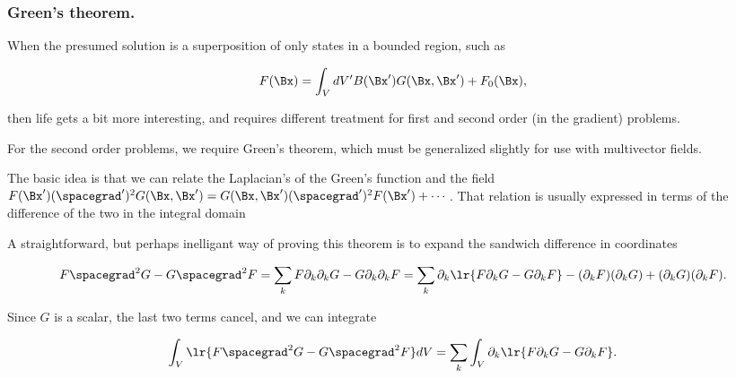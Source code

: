 \subsubsection{Green's theorem.}

When the presumed solution is a superposition of only states in a bounded region, such as

\begin{dmath}\label{eqn:greensFunctionHelmholtz:200}
F(\Bx) = \int_V dV' B(\Bx') G(\Bx, \Bx') + F_0(\Bx),
\end{dmath}

then life gets a bit more interesting, and requires different treatment for first and second order (in the gradient) problems.

For the second order problems, we require Green's theorem, which must be generalized slightly for use with multivector fields.

The basic idea is that we can relate the Laplacian's of the Green's function and the field
\( F(\Bx') (\spacegrad')^2 G(\Bx, \Bx') = G(\Bx, \Bx') (\spacegrad')^2 F(\Bx') + \cdots \).
That relation is usually expressed in terms of the difference of the two in the integral domain


A straightforward, but perhaps inelligant way of proving this theorem is to expand the sandwich difference in coordinates

\begin{dmath}\label{eqn:greensFunctionHelmholtz:260}
F \spacegrad^2 G - G \spacegrad^2 F
=
\sum_k F \partial_k \partial_k G - G \partial_k \partial_k F
=
\sum_k \partial_k \lr{
F \partial_k G - G \partial_k F
}
-
(\partial_k F)(\partial_k G) + (\partial_k G)(\partial_k F).
\end{dmath}

Since \( G \) is a scalar, the last two terms cancel, and we can integrate

\begin{dmath}\label{eqn:greensFunctionHelmholtz:280}
\int_V \lr{ F \spacegrad^2 G - G \spacegrad^2 F } dV
=
\sum_k \int_V \partial_k \lr{ F \partial_k G - G \partial_k F }.
\end{dmath}

